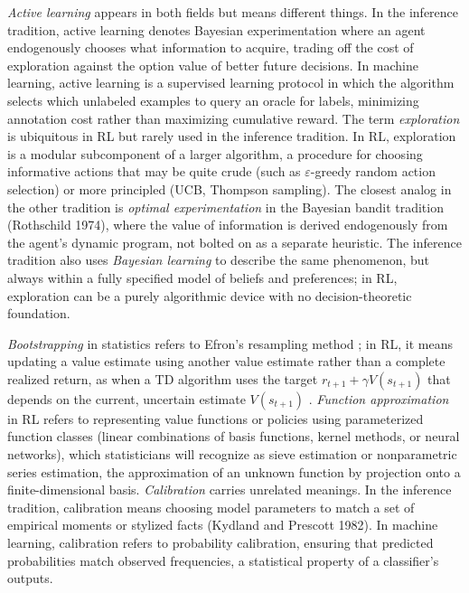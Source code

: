 \textit{Active learning} appears in both fields but means different things. In the inference tradition, active learning denotes Bayesian experimentation where an agent endogenously chooses what information to acquire, trading off the cost of exploration against the option value of better future decisions. In machine learning, active learning is a supervised learning protocol in which the algorithm selects which unlabeled examples to query an oracle for labels, minimizing annotation cost rather than maximizing cumulative reward. The term \textit{exploration} is ubiquitous in RL but rarely used in the inference tradition. In RL, exploration is a modular subcomponent of a larger algorithm, a procedure for choosing informative actions that may be quite crude (such as $\varepsilon$-greedy random action selection) or more principled (UCB, Thompson sampling). The closest analog in the other tradition is \textit{optimal experimentation} in the Bayesian bandit tradition (Rothschild 1974), where the value of information is derived endogenously from the agent's dynamic program, not bolted on as a separate heuristic. The inference tradition also uses \textit{Bayesian learning} to describe the same phenomenon, but always within a fully specified model of beliefs and preferences; in RL, exploration can be a purely algorithmic device with no decision-theoretic foundation.

\textit{Bootstrapping} in statistics refers to Efron's resampling method \citep{Efron1979}; in RL, it means updating a value estimate using another value estimate rather than a complete realized return, as when a TD algorithm uses the target $r_{t+1} + \gamma V(s_{t+1})$ that depends on the current, uncertain estimate $V(s_{t+1})$ \citep{sutton1988}. \textit{Function approximation} in RL refers to representing value functions or policies using parameterized function classes (linear combinations of basis functions, kernel methods, or neural networks), which statisticians will recognize as sieve estimation or nonparametric series estimation, the approximation of an unknown function by projection onto a finite-dimensional basis. \textit{Calibration} carries unrelated meanings. In the inference tradition, calibration means choosing model parameters to match a set of empirical moments or stylized facts (Kydland and Prescott 1982). In machine learning, calibration refers to probability calibration, ensuring that predicted probabilities match observed frequencies, a statistical property of a classifier's outputs.

